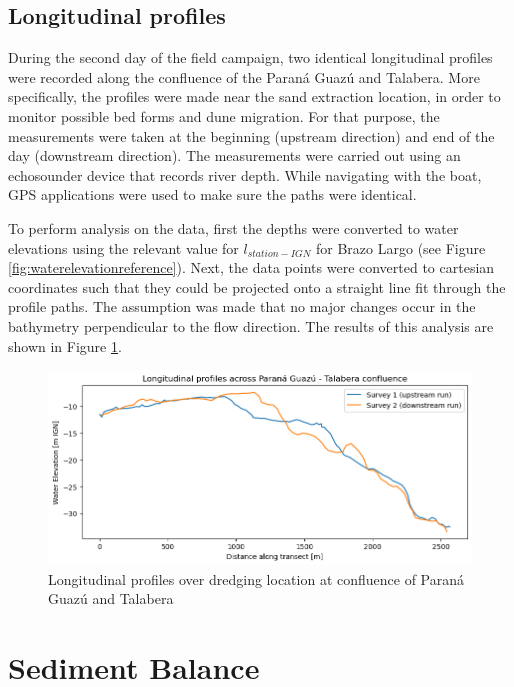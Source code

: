 \subsection{Longitudinal profiles}
During the second day of the field campaign, two identical longitudinal profiles were recorded along the confluence of the Paraná Guazú and Talabera. More specifically, the profiles were made near the sand extraction location, in order to monitor possible bed forms and dune migration. For that purpose, the measurements were taken at the beginning (upstream direction) and end of the day (downstream direction). The measurements were carried out using an echosounder device that records river depth. While navigating with the boat, GPS applications were used to make sure the paths were identical. 

To perform analysis on the data, first the depths were converted to water elevations using the relevant value for $l_{station-IGN}$ for Brazo Largo (see Figure \ref{fig:waterelevationreference}). Next, the data points were converted to cartesian coordinates such that they could be projected onto a straight line fit through the profile paths. The assumption was made that no major changes occur in the bathymetry perpendicular to the flow direction. The results of this analysis are shown in Figure \ref{fig:longitudinal profiles}. 

\begin{figure}
    \centering
    \includegraphics[width=1\linewidth]{figures/ch6/longitudinal profiles.png}
    \caption{Longitudinal profiles over dredging location at confluence of Paraná Guazú and Talabera}
    \label{fig:longitudinal profiles}
\end{figure}



\section{Sediment Balance}
\label{sec: Sediment Balance}






